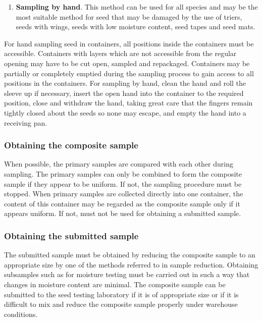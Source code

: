 \documentclass[
]{book}
\providecommand{\tightlist}{%
  \setlength{\itemsep}{0pt}\setlength{\parskip}{0pt}}
\begin{document}
\begin{enumerate}
\def\labelenumi{\alph{enumi}.}
\setcounter{enumi}{3}
\tightlist
\item
  \textbf{Sampling by hand}. This method can be used for all species and may be the most suitable method for seed that may be damaged by the use of triers, seeds with wings, seeds with low moisture content, seed tapes and seed mats.
\end{enumerate}

For hand sampling seed in containers, all positions inside the containers must be accessible. Containers with layers which are not accessible from the regular opening may have to be cut open, sampled and repackaged. Containers may be partially or completely emptied during the sampling process to gain access to all positions in the containers. For sampling by hand, clean the hand and roll the sleeve up if necessary, insert the open hand into the container to the required position, close and withdraw the hand, taking great care that the fingers remain tightly closed about the seeds so none may escape, and empty the hand into a receiving pan.

\hypertarget{obtaining-the-composite-sample}{%
\subsubsection{Obtaining the composite sample}\label{obtaining-the-composite-sample}}

When possible, the primary samples are compared with each other during sampling. The primary samples can only be combined to form the composite sample if they appear to be uniform. If not, the sampling procedure must be stopped. When primary samples are collected directly into one container, the content of this container may be regarded as the composite sample only if it appears uniform. If not, must not be used for obtaining a submitted sample.

\hypertarget{obtaining-the-submitted-sample}{%
\subsubsection{Obtaining the submitted sample}\label{obtaining-the-submitted-sample}}

The submitted sample must be obtained by reducing the composite sample to an appropriate size by one of the methods referred to in sample reduction. Obtaining subsamples such as for moisture testing must be carried out in such a way that changes in moisture content are minimal. The composite sample can be submitted to the seed testing laboratory if it is of appropriate size or if it is difficult to mix and reduce the composite sample properly under warehouse conditions.
\end{document}

